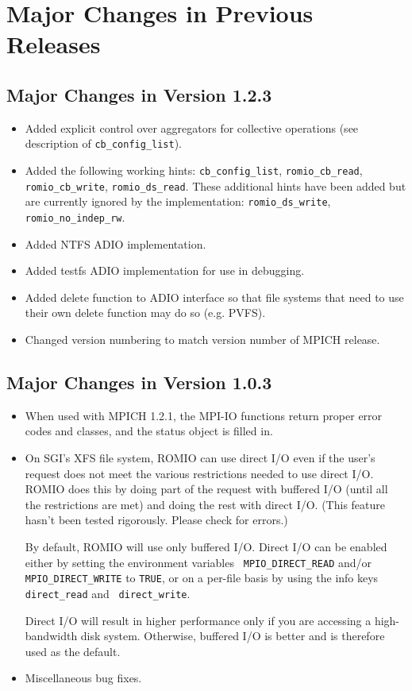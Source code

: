 %
%
\section{Major Changes in Previous Releases}

\subsection{Major Changes in Version 1.2.3}
\begin{itemize}
\item Added explicit control over aggregators for collective operations
      (see description of \texttt{cb\_config\_list}).
\item Added the following working hints: \texttt{cb\_config\_list},
      \texttt{romio\_cb\_read}, \texttt{romio\_cb\_write},\newline
      \texttt{romio\_ds\_read}.  These additional hints have
      been added but are currently ignored by the implementation:
      \texttt{romio\_ds\_write}, \texttt{romio\_no\_indep\_rw}.
\item Added NTFS ADIO implementation.
\item Added testfs ADIO implementation for use in debugging.
\item Added delete function to ADIO interface so that file systems that
      need to use their own delete function may do so (e.g. PVFS).
\item Changed version numbering to match version number of MPICH release.
\end{itemize}

\subsection{Major Changes in Version 1.0.3}
\begin{itemize}
\item When used with MPICH 1.2.1, the MPI-IO functions return proper
error codes and classes, and the status object is filled in.

\item On SGI's XFS file system, ROMIO can use direct I/O even if the
user's request does not meet the various restrictions needed to use
direct I/O. ROMIO does this by doing part of the request with buffered
I/O (until all the restrictions are met) and doing the rest with
direct I/O. (This feature hasn't been tested rigorously. Please check
for errors.)

By default, ROMIO will use only buffered I/O. Direct I/O can be
enabled either by setting the environment variables {\tt
MPIO\_DIRECT\_READ} and/or {\tt MPIO\_DIRECT\_WRITE} to {\tt TRUE}, or
on a per-file basis by using the info keys {\tt direct\_read} and {\tt
direct\_write}.

Direct I/O will result in higher performance only if you are accessing
a high-bandwidth disk system. Otherwise, buffered I/O is better and is
therefore used as the default.

\item Miscellaneous bug fixes.
\end{itemize}

